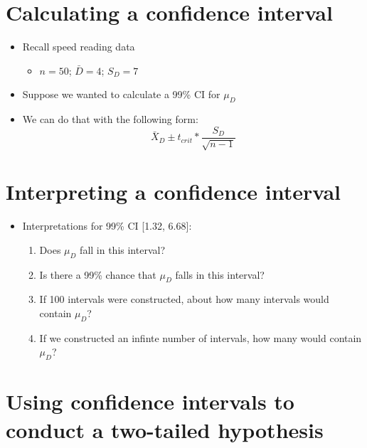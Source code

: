 \documentclass[12pt]{article}
\begin{document}
\section{Calculating a confidence
interval}\label{calculating-a-confidence-interval}

\begin{itemize}
\itemsep1pt\parskip0pt
\item
  Recall speed reading data

  \begin{itemize}
  \itemsep1pt\parskip0pt
  \item
    \(n = 50\); \(\bar{D} = 4\); \(S_{D} = 7\)
  \end{itemize}
\item
  Suppose we wanted to calculate a 99\% CI for \(\mu_{D}\)
\item
  We can do that with the following form:
  \[ \bar{X}_{D} \pm t_{crit} * \frac{S_{D}}{\sqrt{n - 1}} \]
\end{itemize}

\section{Interpreting a confidence
interval}\label{interpreting-a-confidence-interval}

\begin{itemize}
\itemsep1pt\parskip0pt
\item
  Interpretations for 99\% CI {[}1.32, 6.68{]}:

  \begin{enumerate}
  \def\labelenumi{\arabic{enumi}.}
  \itemsep1pt\parskip0pt
  \item
    Does \(\mu_{D}\) fall in this interval?
  \item
    Is there a 99\% chance that \(\mu_{D}\) falls in this interval?
  \item
    If 100 intervals were constructed, about how many intervals would
    contain \(\mu_{D}\)?
  \item
    If we constructed an infinte number of intervals, how many would
    contain \(\mu_{D}\)?
  \end{enumerate}
\end{itemize}

\section{Using confidence intervals to conduct a two-tailed
hypothesis}\label{using-confidence-intervals-to-conduct-a-two-tailed-hypothesis}
\end{document}
